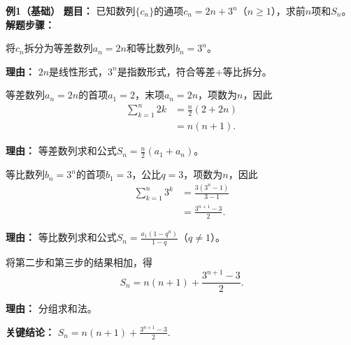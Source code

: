 \begin{examplebox}
	\textbf{\textcolor{CExample}{例1（基础）}}
	\textbf{\textcolor{CExample}{题目：}}
	已知数列$\{c_n\}$的通项$c_n=2n+3^n$（$n\geq1$），求前$n$项和$S_n$。
	\textbf{\textcolor{CExample}{解题步骤：}}
	\begin{description}[style=nextline, leftmargin=2.8em, labelsep=0.5em, itemsep=0.45em]
		\item[\textbf{第一步（通项拆分）：}]
			将$c_n$拆分为等差数列$a_n=2n$和等比数列$b_n=3^n$。
			\par\textbf{理由：} $2n$是线性形式，$3^n$是指数形式，符合等差+等比拆分。
		\item[\textbf{第二步（等差求和）：}]
			等差数列$a_n=2n$的首项$a_1=2$，末项$a_n=2n$，项数为$n$，因此
			\[
				\begin{aligned}
					\sum_{k=1}^{n} 2k &= \frac{n}{2}(2+2n) \\ &= n(n+1).
			\end{aligned}
			\]
			\par\textbf{理由：} 等差数列求和公式$S_n=\frac{n}{2}(a_1+a_n)$。
		\item[\textbf{第三步（等比求和）：}]
			等比数列$b_n=3^n$的首项$b_1=3$，公比$q=3$，项数为$n$，因此
			\[
				\begin{aligned}
					\sum_{k=1}^{n} 3^k &= \frac{3(3^n-1)}{3-1} \\ &= \frac{3^{n+1}-3}{2}.
			\end{aligned}
			\]
			\par\textbf{理由：} 等比数列求和公式$S_n=\frac{a_1(1-q^n)}{1-q}$（$q\neq1$）。
		\item[\textbf{第四步（合并结果）：}]
			将第二步和第三步的结果相加，得
			\[
				S_n = n(n+1) + \frac{3^{n+1}-3}{2}.
			\]
			\par\textbf{理由：} 分组求和法。
	\end{description}
	\textbf{\textcolor{CExample}{关键结论：}}
	\textbf{$S_n = n(n+1) + \frac{3^{n+1}-3}{2}$}.


\end{examplebox}
